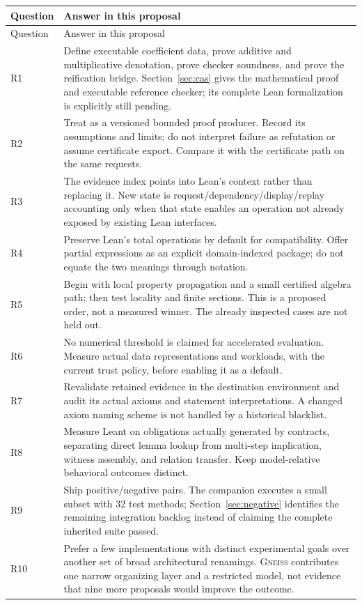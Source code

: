 \documentclass[11pt,letterpaper]{article}
\newcommand{\code}[1]{\texttt{\detokenize{#1}}}
\newcommand{\Gneiss}{\textsc{Gneiss}}
\theoremstyle{definition}
\theoremstyle{remark}
\begin{document}
\begingroup\small
\begin{longtable}{@{}P{.58in}P{5.39in}@{}}
\toprule
Question & Answer in this proposal\\
\midrule\endfirsthead
\toprule Question & Answer in this proposal\\\midrule\endhead
R1 & Define executable coefficient data, prove additive and multiplicative denotation, prove checker soundness, and prove the reification bridge. Section~\ref{sec:cas} gives the mathematical proof and executable reference checker; its complete Lean formalization is explicitly still pending.\\
R2 & Treat \code{grobner} as a versioned bounded proof producer. Record its assumptions and limits; do not interpret failure as refutation or assume certificate export. Compare it with the certificate path on the same requests.\\
R3 & The evidence index points into Lean's context rather than replacing it. New state is request/dependency/display/replay accounting only when that state enables an operation not already exposed by existing Lean interfaces.\\
R4 & Preserve Lean's total operations by default for compatibility. Offer partial expressions as an explicit domain-indexed package; do not equate the two meanings through notation.\\
R5 & Begin with local property propagation and a small certified algebra path; then test locality and finite sections. This is a proposed order, not a measured winner. The already inspected cases are not held out.\\
R6 & No numerical threshold is claimed for accelerated evaluation. Measure actual data representations and workloads, with the current trust policy, before enabling it as a default.\\
R7 & Revalidate retained evidence in the destination environment and audit its actual axioms and statement interpretations. A changed axiom naming scheme is not handled by a historical blacklist.\\
R8 & Measure Leant on obligations actually generated by contracts, separating direct lemma lookup from multi-step implication, witness assembly, and relation transfer. Keep model-relative behavioral outcomes distinct.\\
R9 & Ship positive/negative pairs. The companion executes a small subset with 32 test methods; Section~\ref{sec:negative} identifies the remaining integration backlog instead of claiming the complete inherited suite passed.\\
R10 & Prefer a few implementations with distinct experimental goals over another set of broad architectural renamings. \Gneiss{} contributes one narrow organizing layer and a restricted model, not evidence that nine more proposals would improve the outcome.\\
\bottomrule
\end{longtable}
\endgroup
\end{document}

